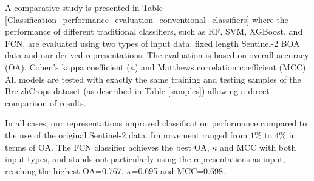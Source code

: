 \documentclass[journal,article,submit,pdftex,moreauthors]{Definitions/mdpi}
\begin{document}

A comparative study is presented in Table \ref{Classification_performance_evaluation_conventional_classifiers} where the performance of different traditional classifiers, such as RF, SVM, XGBoost, and FCN, are evaluated using two types of input data: fixed length Sentinel-2 BOA data and our derived representations. The evaluation is based on overall accuracy (OA), Cohen's kappa coefficient ($\kappa$) and Matthews correlation coefficient (MCC). All models are tested with exactly the same training and testing samples of the BreizhCrops dataset (as described in Table \ref{samples}) allowing a direct comparison of results. 

In all cases, our representations improved classification performance compared to the use of the original Sentinel-2 data.
Improvement ranged from $1\%$ to $4\%$ in terms of OA. The FCN classifier achieves the best OA, $\kappa$ and MCC with both input types, and stands out particularly using the representations as input, reaching the highest OA=0.767, $\kappa$=0.695 and MCC=0.698.
\end{document}
